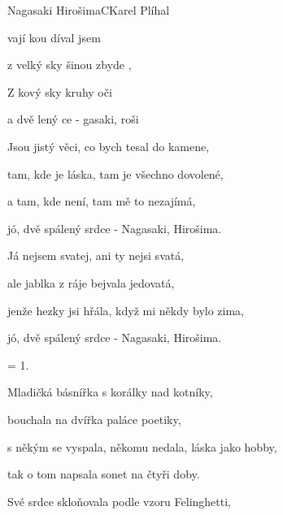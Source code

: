 \setcounter{page}{56}
\begin{song}{Nagasaki Hirošima}{C}{Karel Plíhal}

\begin{SBVerse}

vají kou díval jsem       

z  velký sky šinou zbyde ,

Z kový sky  kruhy  oči

a dvě lený ce - gasaki, roši   

\end{SBVerse}

\begin{SBVerse}

Jsou jistý věci, co bych tesal do kamene,

tam, kde je láska, tam je všechno dovolené,

a tam, kde není, tam mě to nezajímá,

jó, dvě spálený srdce - Nagasaki, Hirošima.

\end{SBVerse}

\begin{SBVerse}

Já nejsem svatej, ani ty nejsi svatá,

ale jablka z ráje bejvala jedovatá,

jenže hezky jsi hřála, když mi někdy bylo zima,

jó, dvě spálený srdce - Nagasaki, Hirošima.

\end{SBVerse}

\begin{SBVerse} = 1.
\end{SBVerse}
\begin{SBVerse}
Mladičká  básnířka s  korálky nad kotníky, 

bouchala  na dvířka paláce  poetiky,

s někým se  vyspala, někomu  nedala, láska jako hobby,

tak o tom napsala sonet na čtyři doby.    
\end{SBVerse}

\begin{SBVerse}
Své srdce skloňovala podle vzoru Felinghetti,


\end{SBVerse}
\end{song}
